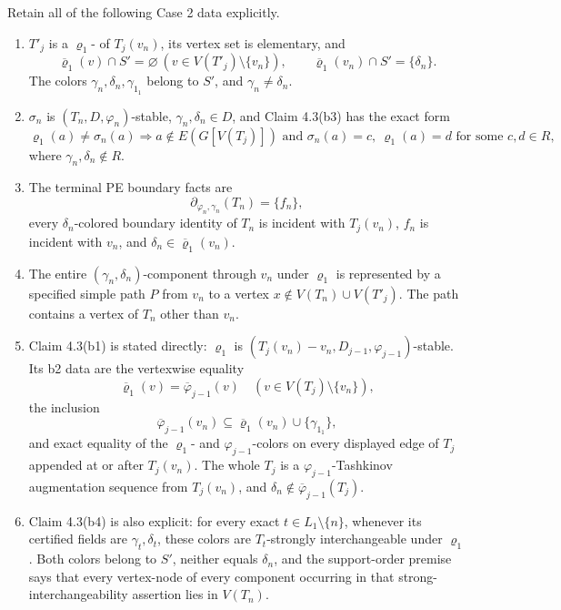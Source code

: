 \begin{lemma}
Retain all of the following Case 2 data explicitly.
\begin{enumerate}
\item \(T'_j\) is a \(\varrho_1\)- of
      \(T_j(v_n)\), its vertex set is elementary, and
      \[
       \overline{\varrho}_1(v)\cap S'=\varnothing
       \ (v\in V(T'_j)\setminus\{v_n\}),\qquad
       \overline{\varrho}_1(v_n)\cap S'=\{\delta_n\}.          \tag{C2}
      \]
      The colors \(\gamma_n,\delta_n,\gamma_{1_1}\) belong to \(S'\),
      and \(\gamma_n\ne\delta_n\).
\item \(\sigma_n\) is \((T_n,D,\varphi_n)\)-stable,
      \(\gamma_n,\delta_n\in D\), and Claim 4.3(b3) has the exact form
      \[
       \varrho_1(a)\ne\sigma_n(a)\Longrightarrow
       a\notin E(G[V(T_j)])\text{ and }
       \sigma_n(a)=c,\ \varrho_1(a)=d
       \text{ for some }c,d\in R,                             \tag{b3}
      \]
      where \(\gamma_n,\delta_n\notin R\).
\item The terminal PE boundary facts are
      \[
       \partial_{\varphi_n,\gamma_n}(T_n)=\{f_n\},
      \]
      every \(\delta_n\)-colored boundary identity of \(T_n\) is
      incident with \(T_j(v_n)\), \(f_n\) is incident with \(v_n\), and
      \(\delta_n\in\overline{\varrho}_1(v_n)\).
\item The entire \((\gamma_n,\delta_n)\)-component through \(v_n\)
      under \(\varrho_1\) is represented by a specified simple path
      \(P\) from \(v_n\) to a vertex
      \(x\notin V(T_n)\cup V(T'_j)\).  The path contains a vertex of
      \(T_n\) other than \(v_n\).
\item Claim 4.3(b1) is stated directly:
      \(\varrho_1\) is
      \((T_j(v_n)-v_n,D_{j-1},\varphi_{j-1})\)-stable.
      Its b2 data are the vertexwise equality
      \[
       \overline{\varrho}_1(v)=\overline\varphi_{j-1}(v)
       \quad(v\in V(T_j)\setminus\{v_n\}),                    \tag{b2v}
      \]
      the inclusion
      \[
       \overline\varphi_{j-1}(v_n)
       \subseteq\overline{\varrho}_1(v_n)\cup\{\gamma_{1_1}\},
      \]
      and exact equality of the \(\varrho_1\)- and
      \(\varphi_{j-1}\)-colors on every displayed edge of \(T_j\)
      appended at or after \(T_j(v_n)\).
      The whole \(T_j\) is a
      \(\varphi_{j-1}\)-Tashkinov augmentation sequence from
      \(T_j(v_n)\), and
      \(\delta_n\notin\overline\varphi_{j-1}(T_j)\).
\item Claim 4.3(b4) is also explicit: for every exact
      \(t\in L_1\setminus\{n\}\), whenever its certified fields are
      \(\gamma_t,\delta_t\), these colors are \(T_t\)-strongly
      interchangeable under \(\varrho_1\).  Both colors belong to
      \(S'\), neither equals \(\delta_n\), and the support-order premise
      says that every vertex-node of every component occurring in that
      strong-interchangeability assertion lies in \(V(T_n)\).
\end{enumerate}


\end{lemma}
